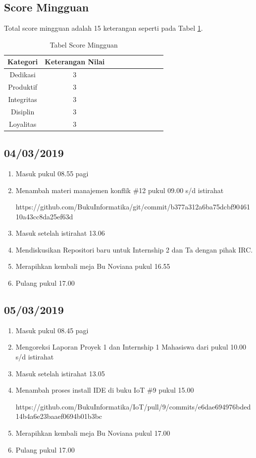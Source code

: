 \subsection{Score Mingguan}
Total score mingguan adalah 15 keterangan seperti pada Tabel \ref{table:scoremingguan}.
\begin{table}[!ht]
\centering
\begin{tabular}{ |c|c|c|c|c|c|c|c|c|c| }
\hline
Kategori & Keterangan Nilai \\
\hline
Dedikasi & 3 \\
\hline
Produktif & 3 \\
\hline
Integritas & 3 \\
\hline
Disiplin & 3 \\
\hline
Loyalitas & 3 \\
\hline
\end{tabular}
\caption{Tabel Score Mingguan}
\label{table:scoremingguan}
\end{table}

\subsection{04/03/2019}
\begin{enumerate}
  \item Masuk pukul 08.55 pagi
  \item Menambah materi manajemen konflik \#12 pukul 09.00 s/d istirahat
  \par https://github.com/BukuInformatika/git/commit/b377a312a6ba75dcbf9046110a43cc8da25ef63d
  \item Masuk setelah istirahat 13.06
  \item Mendiskusikan Repositori baru untuk Internship 2 dan Ta dengan pihak IRC.
  \item Merapihkan kembali meja Bu Noviana pukul 16.55
  \item Pulang pukul 17.00
\end{enumerate}

\subsection{05/03/2019}
\begin{enumerate}
  \item Masuk pukul 08.45 pagi
  \item Mengoreksi Laporan Proyek 1 dan Internship 1 Mahasiswa dari pukul 10.00 s/d istirahat
  \item Masuk setelah istirahat 13.05
  \item Menambah proses install IDE di buku IoT \#9 pukul 15.00
  \par https://github.com/BukuInformatika/IoT/pull/9/commits/e6dae694976bded14b4a6e23baaef0694b01b3bc
  \item Merapihkan kembali meja Bu Noviana pukul 17.00
  \item Pulang pukul 17.00
\end{enumerate} 

